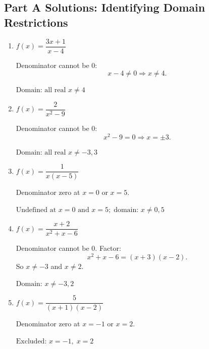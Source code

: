 \documentclass[14pt]{extarticle}
\begin{document}
\subsection*{Part A Solutions: Identifying Domain Restrictions}
\begin{enumerate}
  \item \(f(x) = \dfrac{3x + 1}{x - 4}\)

  Denominator cannot be 0:
  \[
  x - 4 \ne 0 \Rightarrow x \ne 4.
  \]

  \(\boxed{\text{Domain: all real } x \ne 4}\)

  \item \(f(x) = \dfrac{2}{x^2 - 9}\)

  Denominator cannot be 0:
  \[
  x^2 - 9 = 0 \Rightarrow x = \pm 3.
  \]

  \(\boxed{\text{Domain: all real } x \ne -3, 3}\)

  \item \(f(x) = \dfrac{1}{x(x - 5)}\)

  Denominator zero at \(x = 0\) or \(x = 5.\)

  \(\boxed{\text{Undefined at } x = 0 \text{ and } x = 5;\; \text{domain: } x \ne 0, 5}\)

  \item \(f(x) = \dfrac{x + 2}{x^2 + x - 6}\)

  Denominator cannot be 0. Factor:
  \[
  x^2 + x - 6 = (x + 3)(x - 2).
  \]
  So \(x \ne -3\) and \(x \ne 2.\)

  \(\boxed{\text{Domain: } x \ne -3, 2}\)

  \item \(f(x) = \dfrac{5}{(x + 1)(x - 2)}\)

  Denominator zero at \(x = -1\) or \(x = 2.\)

  \(\boxed{\text{Excluded: } x = -1,\; x = 2}\)
\end{enumerate}
\end{document}
